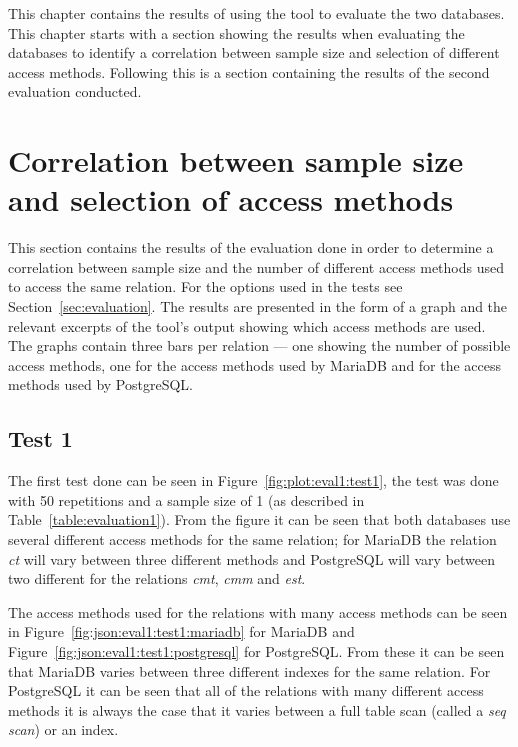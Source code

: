 This chapter contains the results of using the tool to evaluate the two
databases. This chapter starts with a section showing the results when
evaluating the databases to identify a correlation between sample size and
selection of different access methods. Following this is a section containing the
results of the second evaluation conducted.

\section{Correlation between sample size and selection of access methods}\label{sec:correlation}
This section contains the results of the evaluation done in order to determine a
correlation between sample size and the number of different access methods used
to access the same relation.  For the options used in the tests see
Section~\ref{sec:evaluation}. The results are presented in the form of a graph
and the relevant excerpts of the tool's output showing which access methods are
used. The graphs contain three bars per relation --- one showing the number of
possible access methods, one for the access methods used by MariaDB and for the
access methods used by PostgreSQL.

\subsection{Test 1}
The first test done can be seen in Figure~\ref{fig:plot:eval1:test1}, the test
was done with 50 repetitions and a sample size of 1 (as described in
Table~\ref{table:evaluation1}). From the figure it can be seen that both
databases use several different access methods for the same relation; for
MariaDB the relation \textit{ct} will vary between three different methods and
PostgreSQL will vary between two different for the relations \textit{cmt},
\textit{cmm} and \textit{est}.

The access methods used for the relations with many access methods can be seen
in Figure~\ref{fig:json:eval1:test1:mariadb} for MariaDB and
Figure~\ref{fig:json:eval1:test1:postgresql} for PostgreSQL. From these it can
be seen that MariaDB varies between three different indexes for the same
relation. For PostgreSQL it can be seen that all of the relations with many
different access methods it is always the case that it varies between a full
table scan (called a \textit{seq scan}) or an index.

